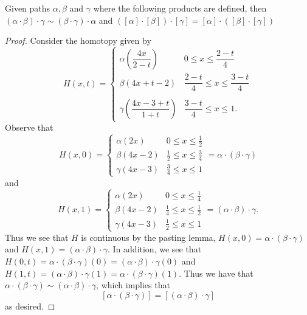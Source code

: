 \documentclass[a4paper,12pt,twoside]{hmcpset}
\begin{document}
\begin{problem}[Theorem 13.4]
    Given paths $\alpha, \beta$ and $\gamma$ where the following
    products are defined, then  
    $(\alpha \cdot \beta) \cdot \gamma \sim (\beta \cdot
    \gamma) \cdot \alpha$ and $([\alpha] \cdot [\beta])\cdot [\gamma]
    = [\alpha]\cdot([\beta] \cdot [\gamma])$
\end{problem}  

\begin{proof}
    Consider the homotopy given by 
    \[
        H(x, t) = 
        \begin{cases}
            \alpha\left( \dfrac{4x}{2 - t} \right) & 0 \le x \le \dfrac{2 - t}{4}\\
            \beta(4x + t -2) & \dfrac{2 - t}{4} \le x \le \dfrac{3 - t}{4} \\
            \\
            \gamma\left( \dfrac{4x - 3 + t}{1 + t} \right) & \dfrac{3 - t}{4} \le x \le 1.
        \end{cases}        
    \]
    Observe that 
    \[
        H(x, 0) = 
        \begin{cases}
            \alpha(2x) & 0 \le x \le \frac{1}{2}\\
            \beta(4x - 2) & \frac{1}{2} \le x \le \frac{3}{4}\\
            \gamma(4x - 3) & \frac{3}{4} \le x \le 1
        \end{cases}
        = \alpha \cdot (\beta \cdot \gamma)
    \]
    and 
    \[
        H(x, 1) = 
        \begin{cases}
            \alpha(2x) & 0 \le x \le \frac{1}{4}\\
            \beta(4x - 2) & \frac{1}{4} \le x \le \frac{1}{2}\\
            \gamma(4x - 3) & \frac{1}{2} \le x \le 1
        \end{cases}
        = (\alpha \cdot \beta) \cdot \gamma.
    \]
    Thus we see that $H$ is continuous by the pasting lemma, $H(x, 0) = \alpha \cdot(\beta
    \cdot \gamma)$ and $H(x, 1) = (\alpha \cdot \beta) \cdot \gamma$.
    In addition, we see that $H(0, t) =\alpha \cdot (\beta \cdot
    \gamma)(0) = (\alpha \cdot \beta) \cdot \gamma(0)$ 
    and 
    $H(1, t) = (\alpha \cdot \beta) \cdot \gamma(1) = \alpha \cdot (\beta \cdot
    \gamma)(1)$. Thus we have that 
    $\alpha \cdot (\beta \cdot \gamma) \sim (\alpha \cdot \beta) \cdot
    \gamma$, which implies that 
    \[
        [\alpha \cdot (\beta \cdot \gamma)] = [(\alpha \cdot \beta) \cdot \gamma]
    \]
    as desired.

\end{proof}
\end{document}
